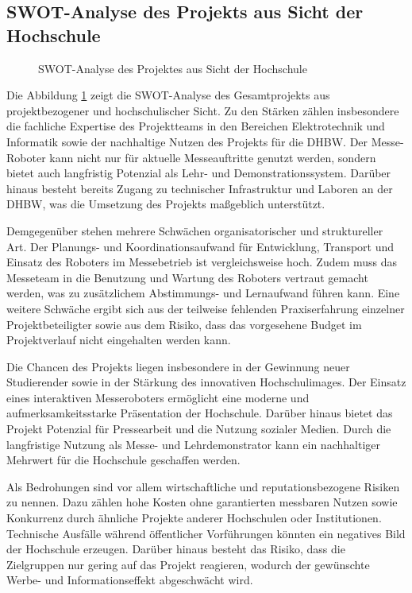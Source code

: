\subsection{SWOT-Analyse des Projekts aus Sicht der Hochschule}
\label{cha:SWOT-Analyse des Projekts aus Sicht der Hochschule}

\begin{figure}[hbt]
	\centering
	
	\vspace{0.5cm}
	\caption{SWOT-Analyse des Projektes aus Sicht der Hochschule}		
	\label{fig:SWOTh}
\end{figure}

Die Abbildung \ref{fig:SWOTh} zeigt die SWOT-Analyse des Gesamtprojekts aus projektbezogener und hochschulischer Sicht. Zu den Stärken zählen insbesondere die fachliche Expertise des Projektteams in den Bereichen Elektrotechnik und Informatik sowie der nachhaltige Nutzen des Projekts für die DHBW. Der Messe-Roboter kann nicht nur für aktuelle Messeauftritte genutzt werden, sondern bietet auch langfristig Potenzial als Lehr- und Demonstrationssystem. Darüber hinaus besteht bereits Zugang zu technischer Infrastruktur und Laboren an der DHBW, was die Umsetzung des Projekts maßgeblich unterstützt.

Demgegenüber stehen mehrere Schwächen organisatorischer und struktureller Art. Der Planungs- und Koordinationsaufwand für Entwicklung, Transport und Einsatz des Roboters im Messebetrieb ist vergleichsweise hoch. Zudem muss das Messeteam in die Benutzung und Wartung des Roboters vertraut gemacht werden, was zu zusätzlichem Abstimmungs- und Lernaufwand führen kann. Eine weitere Schwäche ergibt sich aus der teilweise fehlenden Praxiserfahrung einzelner Projektbeteiligter sowie aus dem Risiko, dass das vorgesehene Budget im Projektverlauf nicht eingehalten werden kann.

Die Chancen des Projekts liegen insbesondere in der Gewinnung neuer Studierender sowie in der Stärkung des innovativen Hochschulimages. Der Einsatz eines interaktiven Messeroboters ermöglicht eine moderne und aufmerksamkeitsstarke Präsentation der Hochschule. Darüber hinaus bietet das Projekt Potenzial für Pressearbeit und die Nutzung sozialer Medien. Durch die langfristige Nutzung als Messe- und Lehrdemonstrator kann ein nachhaltiger Mehrwert für die Hochschule geschaffen werden.

Als Bedrohungen sind vor allem wirtschaftliche und reputationsbezogene Risiken zu nennen. Dazu zählen hohe Kosten ohne garantierten messbaren Nutzen sowie Konkurrenz durch ähnliche Projekte anderer Hochschulen oder Institutionen. Technische Ausfälle während öffentlicher Vorführungen könnten ein negatives Bild der Hochschule erzeugen. Darüber hinaus besteht das Risiko, dass die Zielgruppen nur gering auf das Projekt reagieren, wodurch der gewünschte Werbe- und Informationseffekt abgeschwächt wird.

